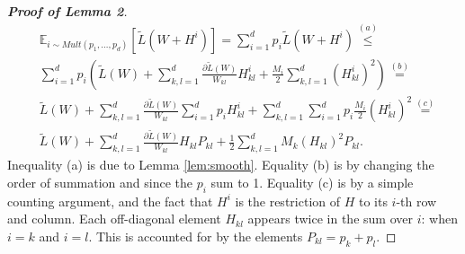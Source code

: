 \documentclass{article} %
\newcommand\mat[1]{{#1}}
\newcommand{\W}{\mat{W}}
\newcommand{\Hh}{\mat{H}}
\newcommand{\Pp}{\mat{P}}
\newcommand{\R}{\mathbb{R}}
\newcommand{\tL}{\tilde{L}(\W)}
\newcommand{\ignore}[1]{}
\newcommand{\grdkl}{\frac{\partial \tL}{\W_{kl}}}
\newtheorem{applemma}{Lemma}
\begin{document}
\ignore{
\begin{applemma}[Expected Separable Overapproximation]\label{applem:ESO}
For any symmetric $\Hh \in \R^{d \times d}$ such that $\W + \Hh$ is PSD, let $\Hh^i \in \R^{d \times d}$, $i=1 \ldots d$ be identical to $\Hh$ on the $i$-th row and column, and $0$ elsewhere. Then:
\begin{align*}
&\mathbb{E}_{i \sim uniform 1 \ldots d} \left[ \tilde{L}(\W + \Hh^i) \right] \leq \\
&\tL + \sum_{k,l=1}^d  \grdkl \Hh_{kl} \Pp_{kl} + \frac{1}{2} \sum_{k,l=1}^d   M_k (\Hh_{kl})^2 \Pp_{kl}
\end{align*}
\end{applemma}}
%
\begin{proof}[\bf{Proof of Lemma 2}]
\begin{align*}
&\mathbb{E}_{i \sim Mult(p_1, \ldots, p_d)} \left[ \tilde{L}(\W + \Hh^i) \right] =\sum_{i=1}^d p_i \tilde{L}(\W + \Hh^i) \stackrel{(a)}{\leq} \\
& \sum_{i=1}^d p_i \left(\tL + \sum_{k,l=1}^d \grdkl \Hh_{kl}^i + \frac{M_i}{2} \sum_{k,l=1}^d  (\Hh_{kl}^i)^2 \right) \stackrel{(b)}{=} \\
& \tL + \sum_{k,l=1}^d \grdkl \sum_{i=1}^d  p_i \Hh_{kl}^i + \sum_{k,l=1}^d  \sum_{i=1}^d  p_i \frac{M_i}{2} (\Hh_{kl}^i)^2  \stackrel{(c)}{=} \\
& \tL + \sum_{k,l=1}^d \grdkl \Hh_{kl} \Pp_{kl} + \frac{1}{2} \sum_{k,l=1}^d M_k (\Hh_{kl})^2 \Pp_{kl}.
\end{align*}
Inequality (a) is due to Lemma \ref{lem:smooth}. Equality (b) is by changing the order of summation and since the $p_i$ sum to 1. Equality (c) is by a simple counting argument, and the fact that $\Hh^i$ is the restriction of $\Hh$ to its $i$-th row and column. Each off-diagonal element $\Hh_{kl}$ appears twice in the sum over $i$: when $i=k$ and $i=l$. This is accounted for by the elements $\Pp_{kl} = p_k + p_l$.
\end{proof}
\end{document}
